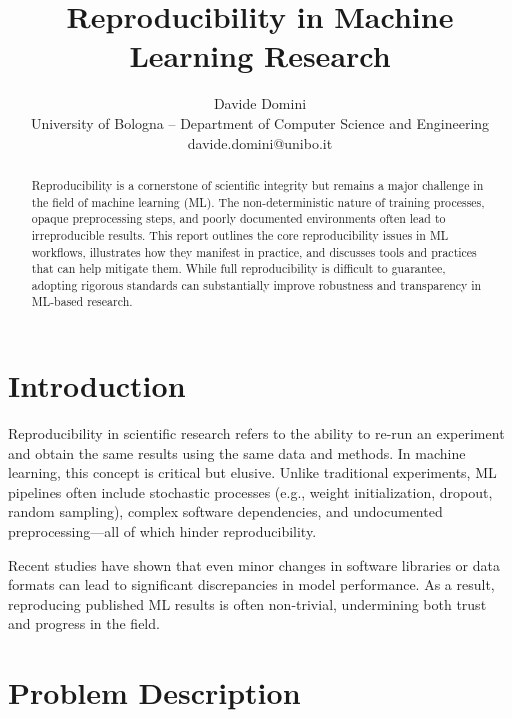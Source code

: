 \documentclass[11pt]{article}
\begin{document}
%
\title{Reproducibility in Machine Learning Research}
\author{Davide Domini \\
University of Bologna -- Department of Computer Science and Engineering\\
davide.domini@unibo.it
}
\maketitle



\begin{abstract}
Reproducibility is a cornerstone of scientific integrity but remains a major challenge 
 in the field of machine learning (ML). 
%
The non-deterministic nature of training processes, opaque preprocessing steps, 
 and poorly documented environments often lead to irreproducible results. 
%
This report outlines the core reproducibility issues in ML workflows, 
 illustrates how they manifest in practice, and discusses tools 
 and practices that can help mitigate them. 
% 
While full reproducibility is difficult to guarantee, adopting rigorous standards 
 can substantially improve robustness and transparency in ML-based research.
\end{abstract}

\section{Introduction}
\label{sec:introduction}
Reproducibility in scientific research refers to the ability to re-run an experiment and 
 obtain the same results using the same data and methods. 
% 
In machine learning, this concept is critical but elusive. 
%
Unlike traditional experiments, ML pipelines often include stochastic processes 
 (e.g., weight initialization, dropout, random sampling), complex software dependencies, 
 and undocumented preprocessing---all of which hinder reproducibility.

Recent studies have shown that even minor changes in software libraries or data formats can 
 lead to significant discrepancies in model performance. 
% 
As a result, reproducing published ML results is often non-trivial, 
 undermining both trust and progress in the field.

\section{Problem Description}
\label{sec:problem}
\end{document}
